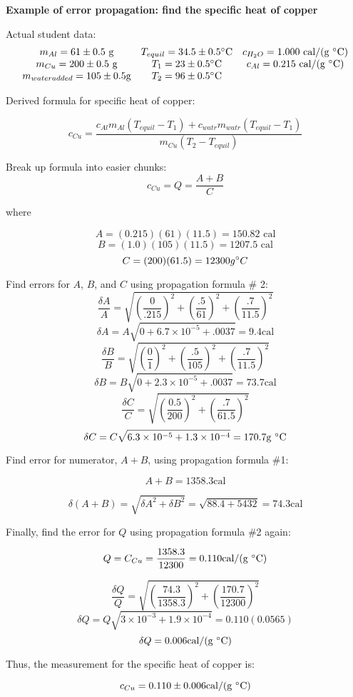 \documentclass[12pt,thmsa]{article}
\def\deg{\ifmmode^\circ\else$^\circ$\fi }
\begin{document}
\begin{centering}
{\bf Example of error propagation:  find the specific heat of copper}
\end{centering}

\medskip

Actual student data:
\[
\begin{array}{ccc}
m_{Al}=61 \pm 0.5 \mbox{ g} & T_{equil}=34.5\pm 0.5\deg \mbox{C} & c_{H_2O}=1.000 \mbox{~cal/(g \deg C)} \\
m_{Cu}=200 \pm 0.5 \mbox{ g}          & T_{1}=23\pm 0.5\deg \mbox{C} & c_{Al}=0.215 \mbox{~cal/(g \deg C)} \\
m_{water added}=105 \pm 0.5 \mbox{g} & T_{2}=96\pm 0.5\deg \mbox{C} &
\end{array}
\]

Derived formula for specific heat of copper:

\[
c_{Cu}= \frac{c_{Al}m_{Al}(T_{equil}-T_1) + c_{watr}m_{watr}(T_{equil}-T_1) }
              {m_{Cu}(T_2 - T_{equil}) } 
\]

Break up formula into easier chunks:
\[
c_{Cu}= Q = \frac{A + B}{C}
\]

where 

\[
A=(0.215)(61)(11.5)=150.82 \mbox{~cal}
\]
\[
B=(1.0)(105)(11.5) = 1207.5 \mbox{~cal}
\]
\[
C=(200)(61.5) = 12300 g \deg C
\]

Find errors for $A$, $B$, and $C$ using propagation formula \# 2:
\[
\frac{\delta A}{A} = \sqrt{\left(\frac{0}{.215}\right)^2+\left(\frac{.5}{61}\right)^2+\left(\frac{.7}{11.5}\right)^2}
\]
\[
\delta A = A \sqrt{0+6.7\times 10^{-5}+ .0037} = 9.4 \mbox{cal}
\]
\[
\frac{\delta B}{B} = \sqrt{\left(\frac{0}{1}\right)^2+\left(\frac{.5}{105}\right)^2+\left(\frac{.7}{11.5}\right)^2}
\]
\[
\delta B = B \sqrt{0+2.3\times 10^{-5}+ .0037} = 73.7 \mbox{cal}
\]
\[
\frac{\delta C}{C} = \sqrt{\left(\frac{0.5}{200}\right)^2+\left(\frac{.7}{61.5}\right)^2}
\]
\[
\delta C = C \sqrt{6.3\times 10^{-5} + 1.3\times 10^{-4} } = 170.7 \mbox{g \deg C}
\]

Find error for numerator, $A+B$, using propagation formula \#1:

\[
A + B = 1358.3 \mbox{cal}
\]

\[
\delta (A+B) = \sqrt{\delta A^2 + \delta B^2} = \sqrt{88.4+5432} = 74.3 \mbox{cal}
\]

Finally, find the error for $Q$ using propagation formula \#2 again:

\[
Q=C_{Cu} = \frac{1358.3 }{12300} = 0.110 \mbox{cal/(g \deg C)} 
\]

\[
\frac{\delta Q}{Q} = 
 \sqrt{\left(\frac{74.3}{1358.3}\right)^2+\left(\frac{170.7}{12300}\right)^2}
\]
\[
\delta Q = Q \sqrt{3\times 10^{-3} + 1.9\times 10^{-4} }  = 0.110(0.0565)
\]
\[
\delta Q = 0.006 \mbox{cal/(g \deg C)} 
\]

Thus, the measurement for the specific heat of copper is:

\[
c_{Cu} = 0.110 \pm 0.006 \mbox{cal/(g \deg C)}
\]
\end{document}

